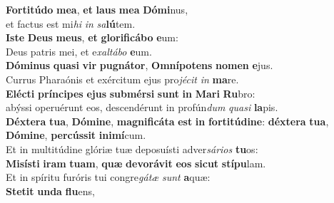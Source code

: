 \evenverse \textbf{For}\textbf{ti}\textbf{tú}\textbf{do} \textbf{me}\textbf{a}, \textbf{et} \textbf{laus} \textbf{me}\textbf{a} \textbf{Dó}\textbf{mi}nus,~\*\\
\evenverse et factus est mi\textit{hi} \textit{in} \textit{sa}\textbf{lú}tem.\\
\oddverse \textbf{I}\textbf{ste} \textbf{De}\textbf{us} \textbf{me}\textbf{us}, \textbf{et} \textbf{glo}\textbf{ri}\textbf{fi}\textbf{cá}\textbf{bo} \textbf{e}um:~\*\\
\oddverse Deus patris mei, et e\textit{xal}\textit{tá}\textit{bo} \textbf{e}um.\\
\evenverse \textbf{Dó}\textbf{mi}\textbf{nus} \textbf{qua}\textbf{si} \textbf{vir} \textbf{pu}\textbf{gná}\textbf{tor}, \textbf{Om}\textbf{ní}\textbf{po}\textbf{tens} \textbf{no}\textbf{men} \textbf{e}jus.~\*\\
\evenverse Currus Pharaónis et exércitum ejus pro\textit{jé}\textit{cit} \textit{in} \textbf{ma}re.\\
\oddverse \textbf{E}\textbf{lé}\textbf{cti} \textbf{prín}\textbf{ci}\textbf{pes} \textbf{e}\textbf{jus} \textbf{sub}\textbf{mér}\textbf{si} \textbf{sunt} \textbf{in} \textbf{Ma}\textbf{ri} \textbf{Ru}bro:~\*\\
\oddverse abýssi operuérunt eos, descendérunt in profún\textit{dum} \textit{qua}\textit{si} \textbf{la}pis.\\
\evenverse \textbf{Déx}\textbf{te}\textbf{ra} \textbf{tu}\textbf{a}, \textbf{Dó}\textbf{mi}\textbf{ne}, \textbf{ma}\textbf{gni}\textbf{fi}\textbf{cá}\textbf{ta} \textbf{est} \textbf{in} \textbf{for}\textbf{ti}\textbf{tú}\textbf{di}\textbf{ne}: \textbf{déx}\textbf{te}\textbf{ra} \textbf{tu}\textbf{a}, \textbf{Dó}\textbf{mi}\textbf{ne}, \textbf{per}\textbf{cús}\textbf{sit} \textbf{i}\textbf{ni}\textbf{mí}cum.~\*\\
\evenverse Et in multitúdine glóriæ tuæ deposuísti adver\textit{sá}\textit{ri}\textit{os} \textbf{tu}os:\\
\oddverse \textbf{Mi}\textbf{sí}\textbf{sti} \textbf{i}\textbf{ram} \textbf{tu}\textbf{am}, \textbf{quæ} \textbf{de}\textbf{vo}\textbf{rá}\textbf{vit} \textbf{e}\textbf{os} \textbf{si}\textbf{cut} \textbf{stí}\textbf{pu}lam.~\*\\
\oddverse Et in spíritu furóris tui congre\textit{gá}\textit{tæ} \textit{sunt} \textbf{a}quæ:\\
\evenverse \textbf{Ste}\textbf{tit} \textbf{un}\textbf{da} \textbf{flu}ens,~\*\\
